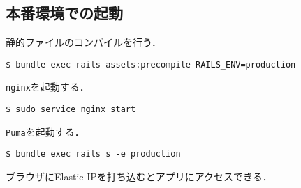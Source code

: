 \subsection{本番環境での起動}
静的ファイルのコンパイルを行う．
\begin{screen}
    \texttt{\$ bundle exec rails assets:precompile RAILS\_ENV=production}
\end{screen}
\texttt{nginx}を起動する．
\begin{screen}
    \texttt{\$ sudo service nginx start}
\end{screen}
\texttt{Puma}を起動する．
\begin{screen}
    \texttt{\$ bundle exec rails s -e production}
\end{screen}
ブラウザにElastic IPを打ち込むとアプリにアクセスできる．